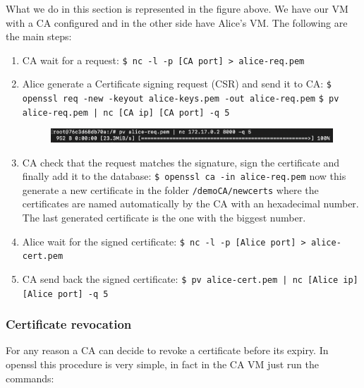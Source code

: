 \documentclass[11pt]{article}
\begin{document}
What we do in this section is represented in the figure above. We have our VM with a CA configured and in the other side have Alice's VM. The following are the main steps:
\begin{enumerate}
  \item CA wait for a request:\newline
  \texttt{\$ nc -l -p [CA port] > alice-req.pem}

  \item Alice generate a Certificate signing request (CSR) and send it to CA:\newline
  \texttt{\$ openssl req -new -keyout alice-keys.pem -out alice-req.pem}\newline
  \texttt{\$ pv alice-req.pem | nc [CA ip] [CA port] -q 5}

  \begin{figure}[!ht]
    \includegraphics[width=1\textwidth]{pic6-hw6-7-1635747}
    \label{fig:pv result}
  \end{figure}

  \item CA check that the request matches the signature, sign the certificate and finally add it to the database:\newline
  \texttt{\$ openssl ca -in alice-req.pem}\newline
  now this generate a new certificate in the folder \texttt{/demoCA/newcerts} where the certificates are named automatically by the CA with an hexadecimal number. The last generated certificate is the one with the biggest number.

  \item Alice wait for the signed certificate:\newline
  \texttt{\$ nc -l -p [Alice port] > alice-cert.pem}

  \item CA send back the signed certificate:\newline
  \texttt{\$ pv alice-cert.pem | nc [Alice ip] [Alice port] -q 5}
\end{enumerate}

\subsubsection{Certificate revocation}
For any reason a CA can decide to revoke a certificate before its expiry. In openssl this procedure is very simple, in fact in the CA VM just run the commands:
\end{document}

